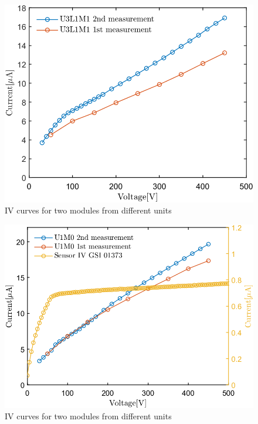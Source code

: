 \begin{figure}[h!]
\centering
\includegraphics[width=0.65\columnwidth]{Chapter6/DCS/images/IV/U3L1FEB3.png}
\caption{IV curves for two modules from different units}
\label{fig_U3L1}
\end{figure}

\begin{figure}[h!]
\centering
\includegraphics[width=0.55\columnwidth]{Chapter6/DCS/images/IV/U1FEB1.png}
\caption{IV curves for two modules from different units}
\label{fig_U3L1}
\end{figure}

